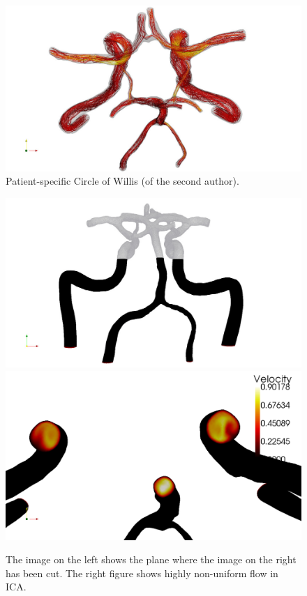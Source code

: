 \begin{figure}
  \begin{center}
    \includegraphics[width=\fullfig]{chapters/kvs-2/pdf/cok_top_steam_white.pdf}
  \end{center}
  \caption{Patient-specific Circle of Willis (of the second author).}
  \label{fig:kvs-2:screenshot}
\end{figure}

\begin{figure}
  \begin{center}
    \includegraphics[width=\largefig]{chapters/kvs-2/pdf/cok_slice.pdf} \\
    \includegraphics[width=\largefig]{chapters/kvs-2/pdf/cok_ica_vel_peak_syst.pdf}
  \end{center}
    \caption{The image on the left shows the plane where the image on
      the right has been cut.  The right figure shows highly
      non-uniform flow in ICA.}
    \label{fig:kvs-2:cok_ica}
\end{figure}

